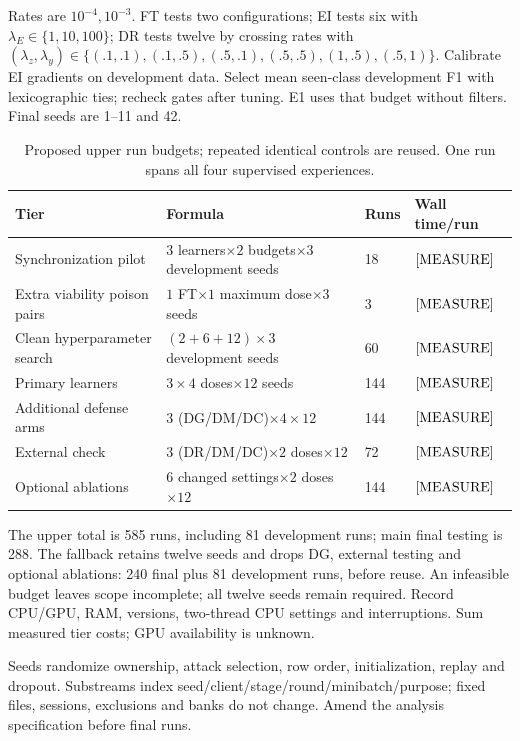 \documentclass[10pt,a4paper]{article}
\newcommand{\meas}{\textnormal{[MEASURE]}}
\begin{document}
Rates are $10^{-4},10^{-3}$. FT tests two configurations; EI tests six with $\lambda_E\in\{1,10,100\}$; DR tests twelve by crossing rates with $(\lambda_z,\lambda_y)\in\{(.1,.1),(.1,.5),(.5,.1),(.5,.5),(1,.5),(.5,1)\}$. Calibrate EI gradients on development data. Select mean seen-class development F1 with lexicographic ties; recheck gates after tuning. E1 uses that budget without filters. Final seeds are 1--11 and 42.

\begin{table}[htbp]
\centering\footnotesize
\caption{Proposed upper run budgets; repeated identical controls are reused. One run spans all four supervised experiences.}
\label{tab:budget}
\begin{tabularx}{\linewidth}{Y L{4.8cm}L{1.1cm}L{2.5cm}}
\toprule
Tier & Formula & Runs & Wall time/run\\
\midrule
Synchronization pilot & $3$ learners$\times2$ budgets$\times3$ development seeds & 18 & $\meas$\\
Extra viability poison pairs & $1$ FT$\times1$ maximum dose$\times3$ seeds & 3 & $\meas$\\
Clean hyperparameter search & $(2+6+12)\times3$ development seeds & 60 & $\meas$\\
Primary learners & $3\times4$ doses$\times12$ seeds & 144 & $\meas$\\
Additional defense arms & $3$ (DG/DM/DC)$\times4\times12$ & 144 & $\meas$\\
External check & $3$ (DR/DM/DC)$\times2$ doses$\times12$ & 72 & $\meas$\\
Optional ablations & $6$ changed settings$\times2$ doses$\times12$ & 144 & $\meas$\\
\bottomrule
\end{tabularx}
\end{table}
The upper total is 585 runs, including 81 development runs; main final testing is 288. The fallback retains twelve seeds and drops DG, external testing and optional ablations: 240 final plus 81 development runs, before reuse. An infeasible budget leaves scope incomplete; all twelve seeds remain required. Record CPU/GPU, RAM, versions, two-thread CPU settings and interruptions. Sum measured tier costs; GPU availability is unknown.

Seeds randomize ownership, attack selection, row order, initialization, replay and dropout. Substreams index seed/client/stage/round/minibatch/purpose; fixed files, sessions, exclusions and banks do not change. Amend the analysis specification before final runs.
\end{document}
